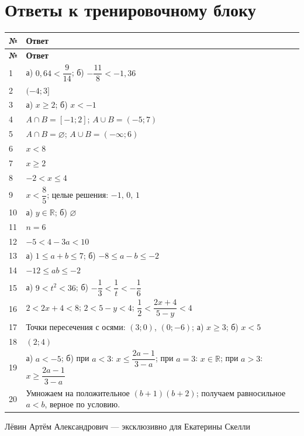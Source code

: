 \documentclass[a4paper,12pt]{article}
\begin{document}
\section*{\color{darkaccent}Ответы к тренировочному блоку}
\renewcommand{\arraystretch}{1.4}
\small
\begin{longtable}{@{}p{10mm}p{\dimexpr\linewidth-16mm\relax}@{}}
\toprule
\textbf{№} & \textbf{Ответ}\\
\midrule
\endfirsthead
\toprule \textbf{№} & \textbf{Ответ}\\ \midrule
\endhead
1 & а) $0{,}64<\dfrac9{14}$; б) $-\dfrac{11}{8}<-1{,}36$\\
2 & $(-4;3]$\\
3 & а) $x\ge2$; б) $x<-1$\\
4 & $A\cap B=[-1;2]$; $A\cup B=(-5;7)$\\
5 & $A\cap B=\varnothing$; $A\cup B=(-\infty;6)$\\
6 & $x<8$\\
7 & $x\ge2$\\
8 & $-2<x\le4$\\
9 & $x<\dfrac85$; целые решения: $-1,\,0,\,1$\\
10 & а) $y\in\mathbb R$; б) $\varnothing$\\
11 & $n=6$\\
12 & $-5<4-3a<10$\\
13 & а) $1\le a+b\le7$; б) $-8\le a-b\le-2$\\
14 & $-12\le ab\le-2$\\
15 & а) $9<t^2<36$; б) $-\dfrac13<\dfrac1t<-\dfrac16$\\
16 & $2<2x+4<8$; $2<5-y<4$; $\dfrac12<\dfrac{2x+4}{5-y}<4$\\
17 & Точки пересечения с осями: $(3;0)$, $(0;-6)$; а) $x\ge3$; б) $x<5$\\
18 & $(2;4)$\\
19 & а) $a<-5$; б) при $a<3$: $x\le\dfrac{2a-1}{3-a}$; при $a=3$: $x\in\mathbb R$; при $a>3$: $x\ge\dfrac{2a-1}{3-a}$\\
20 & Умножаем на положительное $(b+1)(b+2)$; получаем равносильное $a<b$, верное по условию.\\
\bottomrule
\end{longtable}
\normalsize
\vfill
\begin{center}
\small\color{lightgray}Лёвин Артём Александрович --- эксклюзивно для Екатерины Скелли
\end{center}
\end{document}
